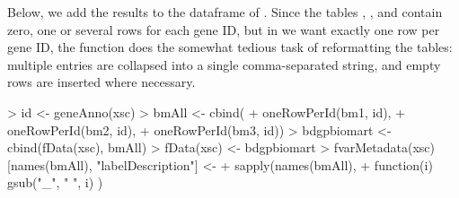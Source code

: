 %
Below, we add the results
to the dataframe  of . 
Since the tables ,
, and  contain zero, one or several rows for
each gene ID, but in  we want exactly one row per
gene ID, the function  does the somewhat tedious
task of reformatting the tables: multiple entries are collapsed
into a single comma-separated string, and empty rows are inserted
where necessary.
%
\begin{Schunk}
\begin{Sinput}
> id <- geneAnno(xsc)
> bmAll <- cbind(
+    oneRowPerId(bm1, id),
+    oneRowPerId(bm2, id),
+    oneRowPerId(bm3, id)) 
> bdgpbiomart <- cbind(fData(xsc), bmAll)
> fData(xsc) <- bdgpbiomart
> fvarMetadata(xsc)[names(bmAll), "labelDescription"] <- 
+     sapply(names(bmAll), 
+            function(i) gsub("_", " ", i) )
\end{Sinput}
\end{Schunk}


